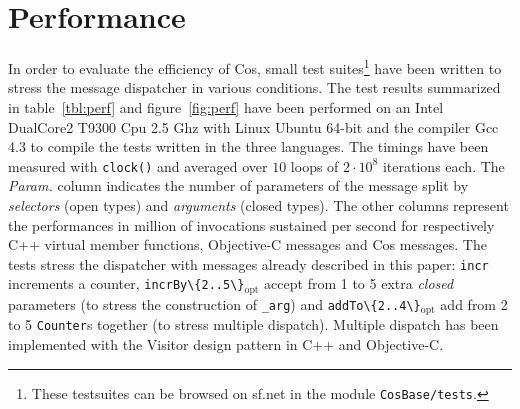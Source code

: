 \documentclass[preprint,10pt]{sigplanconf}
\newcommand{\acronym}[1]{{\sc #1}\xspace}
\newcommand{\Cpu}    {\acronym{Cpu}}
\newcommand{\Gcc}    {\acronym{Gcc}}
\newcommand{\ProgLang}[1]{{\sc #1}\xspace}
\newcommand{\Cpp}       {\ProgLang{C{\small ++}}}
\newcommand{\Cos}       {\ProgLang{Cos}}
\newcommand{\Objc}      {\ProgLang{Objective-C}}
\newcommand{\opt}{\ensuremath{_{\text{opt}}}\xspace}
\newcommand{\code}[1]{\lstinline[language=COS,style=samplecode]|#1|}
\begin{document}
\section{Performance\label{sec:perf}}


In order to evaluate the efficiency of \Cos, small test suites\footnote{These testsuites can be browsed on sf.net in the module {\tt CosBase/tests}.} have been written to stress the message dispatcher in various conditions. The test results summarized in table~\ref{tbl:perf} and figure~\ref{fig:perf} have been performed on an Intel DualCore2\texttrademark{} T9300 \Cpu 2.5 Ghz with Linux Ubuntu 64-bit and the compiler \Gcc 4.3 to compile the tests written in the three languages. The timings have been measured with \code{clock()} and averaged over $10$ loops of $2 \cdot 10^8$ iterations each. The {\em Param.} column indicates the number of parameters of the message split by {\em selectors} (open types) and {\em arguments} (closed types). The other columns represent the performances in million of invocations sustained per second for respectively \Cpp virtual member functions, \Objc messages and \Cos messages. The tests stress the dispatcher with messages already described in this paper: \code{incr} increments a counter, \code{incrBy\{2..5\}}\opt accept from 1 to 5 extra {\em closed} parameters (to stress the construction of \code{_arg}) and \code{addTo\{2..4\}}\opt add from 2 to 5 \code{Counter}s together (to stress multiple dispatch). Multiple dispatch has been implemented with the Visitor design pattern in \Cpp and \Objc.
\end{document}

